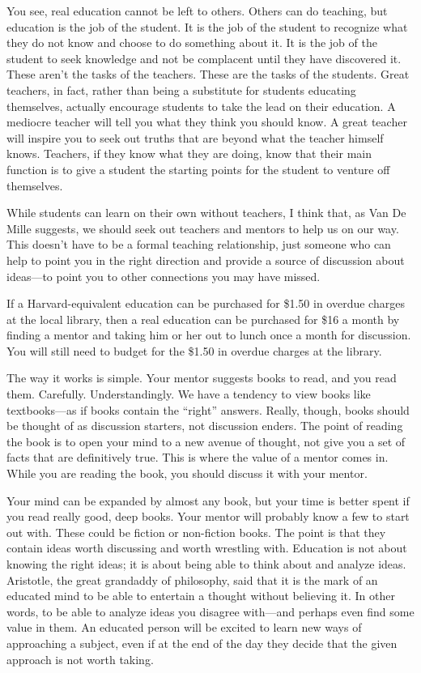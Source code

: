 \documentclass[letterpaper]{article}
\begin{document}
{\color{black}
You see, real education cannot be left to others. Others can do
teaching, but education is the job of the student. It is the job of the
student to recognize what they do not know and choose to do something
about it. It is the job of the student to seek knowledge and not be
complacent until they have discovered it. These aren’t the tasks of the
teachers. These are the tasks of the students. Great teachers, in fact,
rather than being a substitute for students educating themselves,
actually encourage students to take the lead on their education. A
mediocre teacher will tell you what they think you should know. A great
teacher will inspire you to seek out truths that are beyond what the
teacher himself knows. Teachers, if they know what they are doing, know
that their main function is to give a student the starting points for
the student to venture off themselves.}

{\color{black}
While students can learn on their own without teachers, I think that, as
Van De Mille suggests, we should seek out teachers and mentors to help
us on our way. This doesn’t have to be a formal teaching relationship,
just someone who can help to point you in the right direction and
provide a source of discussion about ideas—to point you to other
connections you may have missed.}

{\color{black}
If a Harvard-equivalent education can be purchased for \$1.50 in overdue
charges at the local library, then a real education can be purchased
for \$16 a month by finding a mentor and taking him or her out to lunch
once a month for discussion. You will still need to budget for the
\$1.50 in overdue charges at the library.}

{\color{black}
The way it works is simple. Your mentor suggests books to read, and you
read them. Carefully. Understandingly. We have a tendency to view books
like textbooks—as if books contain the “right” answers. Really, though,
books should be thought of as discussion starters, not discussion
enders. The point of reading the book is to open your mind to a new
avenue of thought, not give you a set of facts that are definitively
true. This is where the value of a mentor comes in. While you are
reading the book, you should discuss it with your mentor.}

{\color{black}
Your mind can be expanded by almost any book, but your time is better
spent if you read really good, deep books. Your mentor will probably
know a few to start out with. These
\textcolor[rgb]{0.32941177,0.5529412,0.83137256}{could} be fiction or
non-fiction books. The point is that they contain ideas worth
discussing and worth wrestling with. Education is not about knowing the
right ideas; it is about being able to think about and analyze ideas.
Aristotle, the great grandaddy of philosophy, said that it is the mark
of an educated mind to be able to entertain a thought without believing
it. In other words, to be able to analyze ideas you disagree with—and
perhaps even find some value in them. An educated person will be
excited to learn new ways of approaching a subject, even if at the end
of the day they decide that the given approach is not worth taking.}
\end{document}
